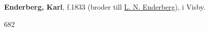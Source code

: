 \textbf{Enderberg, Karl}, f.\@ 1833 (broder till \href{Enderberg-L-N}{L. N. Enderberg}), i Visby.

682 
